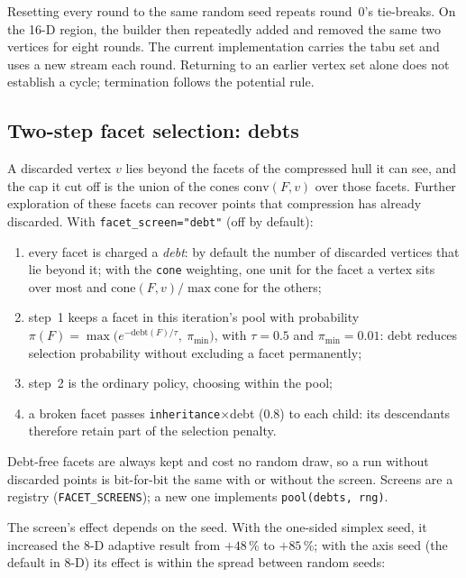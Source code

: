 \documentclass[11pt,a4paper]{report}
\newcommand{\trap}[1]{\begin{warnbox}#1\end{warnbox}}
\newcommand{\code}[1]{\texttt{\small #1}}
\begin{document}
\trap{Resetting every round to the same random seed repeats round~0's
tie-breaks. On the 16-D region, the builder then repeatedly added and removed
the same two vertices for eight rounds. The current implementation carries
the tabu set and uses a new stream each round. Returning to an earlier vertex
set alone does not establish a cycle; termination follows the potential rule.}

\subsection{Two-step facet selection: debts}
\label{sec:debt}

A discarded vertex $v$ lies beyond the facets of the compressed hull it can see,
and the cap it cut off is the union of the cones $\mathrm{conv}(F,v)$ over those
facets. Further exploration of these facets can recover points that compression
has already discarded. With \code{facet\_screen="debt"} (off by default):

\begin{enumerate}
\item every facet is charged a \emph{debt}: by default the number of discarded
  vertices that lie beyond it; with the \code{cone} weighting, one unit for the
  facet a vertex sits over most and $\mathrm{cone}(F,v)/\max\mathrm{cone}$ for
  the others;
\item step~1 keeps a facet in this iteration's pool with probability
  $\pi(F) = \max\bigl(e^{-\mathrm{debt}(F)/\tau},\ \pi_{\min}\bigr)$, with
  $\tau = 0.5$ and $\pi_{\min} = 0.01$: debt reduces selection probability
  without excluding a facet permanently;
\item step~2 is the ordinary policy, choosing within the pool;
\item a broken facet passes \code{inheritance}$\times$debt (0.8) to each child:
  its descendants therefore retain part of the selection penalty.
\end{enumerate}

Debt-free facets are always kept and cost no random draw, so a run without
discarded points is bit-for-bit the same with or without the screen. Screens are
a registry (\code{FACET\_SCREENS}); a new one implements \code{pool(debts, rng)}.

The screen's effect depends on the seed. With the one-sided simplex seed, it
increased the 8-D adaptive result from $+48$\,\% to $+85$\,\%; with the axis seed
(the default in 8-D) its effect is within the spread between random seeds:
\end{document}
